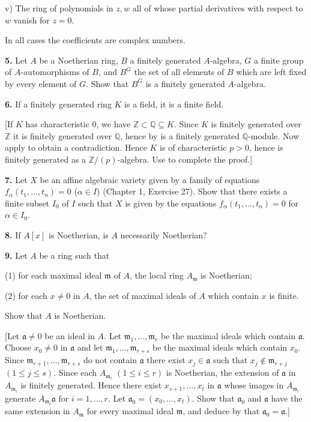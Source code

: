 v) The ring of polynomials in $z,w$ all of whose partial derivatives with respect
to $w$ vanish for $z=0$.

In all cases the coefficients are complex numbers.

\medskip
\noindent\amstar\textbf{5.} Let $A$ be a Noetherian ring, $B$ a finitely generated $A$-algebra, $G$ a finite group of
$A$-automorphisms of $B$, and $B^G$ the set of all elements of $B$ which are left fixed
by every element of $G$.  Show that $B^G$ is a finitely generated $A$-algebra.

\medskip
\noindent\textbf{6.} If a finitely generated ring $K$ is a field, it is a finite field.

[If $K$ has characteristic 0, we have $\mathbb Z\subset\mathbb Q\subseteq K$.  Since $K$ is finitely generated
over $\mathbb Z$ it is finitely generated over $\mathbb Q$, hence by  is a finitely generated $\mathbb Q$-module.  Now apply  to obtain a contradiction.  Hence $K$ is of characteristic
$p>0$, hence is finitely generated as a $\mathbb Z/(p)$-algebra.  Use  to complete the
proof.]

\medskip
\noindent\textbf{7.} Let $X$ be an affine algebraic variety given by a family of equations $f_\alpha(t_1,\ldots,t_n)
=0$ ($\alpha\in I$) (Chapter 1, Exercise 27).  Show that there exists a finite subset $I_0$ of $I$
such that $X$ is given by the equations $f_\alpha(t_1,\ldots,t_n)=0$ for $\alpha\in I_0$.

\medskip
\noindent\textbf{8.} If $A[x]$ is Noetherian, is $A$ necessarily Noetherian?

\medskip
\noindent\textbf{9.} Let $A$ be a ring such that

(1) for each maximal ideal $\mathfrak m$ of $A$, the local ring $A_\mathfrak m$ is Noetherian;

(2) for each $x\ne0$ in $A$, the set of maximal ideals of $A$ which contain $x$ is
finite.

Show that $A$ is Noetherian.

[Let $\mathfrak a\ne0$ be an ideal in $A$.  Let $\mathfrak m_1,\ldots,\mathfrak m_r$ be the maximal ideals which
contain $\mathfrak a$.  Choose $x_0\ne0$ in $\mathfrak a$ and let $\mathfrak m_1,\ldots,\mathfrak m_{r+s}$ be the maximal ideals
which contain $x_0$.  Since $\mathfrak m_{r+1},\ldots,\mathfrak m_{r+s}$ do not contain $\mathfrak a$ there exist $x_j\in\mathfrak a$ such
that $x_j\notin\mathfrak m_{r+j}$ $(1\leq j\leq s)$.  Since each $A_{\mathfrak m_i}$ $(1\leq i\leq r)$ is Noetherian, the extension of $\mathfrak a$ in $A_{\mathfrak m_i}$ is finitely generated.  Hence there exist $x_{s+1},\ldots,x_t$ in $\mathfrak a$
whose images in $A_{\mathfrak m_i}$ generate $A_{\mathfrak m_i}\mathfrak a$ for $i=1,\ldots,r$.  Let $\mathfrak a_0=(x_0,\ldots,x_t)$.
Show that $\mathfrak a_0$ and $\mathfrak a$ have the same extension in $A_\mathfrak m$ for every maximal ideal $\mathfrak m$, and
deduce by  that $\mathfrak a_0=\mathfrak a$.]


